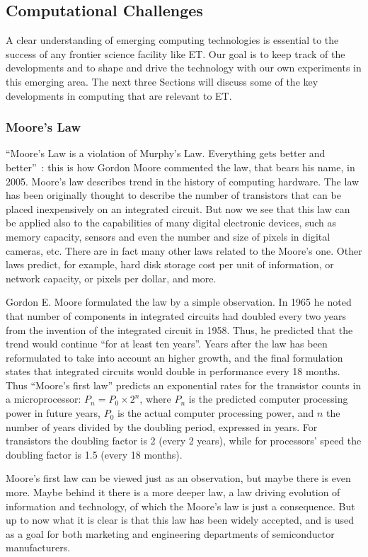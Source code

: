 \subsection{Computational Challenges}
A clear understanding of emerging computing technologies is essential to
the success of any frontier science facility like ET.
Our goal is to keep track of the developments and to shape and drive
the technology with our own experiments in this emerging area. The next
three Sections will discuss some of the key developments in computing that
are relevant to ET.


\subsubsection{Moore's Law}
\label{sec:MLbox}
``Moore's Law is a violation of Murphy's Law. Everything gets better and better''~\cite{MooresFrase2}: this is how Gordon Moore
commented the law, that bears his name, in 2005. Moore's law describes trend in the history of computing
hardware. The law has been originally thought to describe the number of transistors that can be placed
inexpensively on an integrated circuit. But now we see that this law can be applied also to the capabilities
of many digital electronic devices, such as memory capacity, sensors and even the number and size
of pixels in digital cameras, etc. There are in fact many other laws related to the Moore's one. Other laws
predict, for example, hard disk storage cost per unit of information, or network capacity, or pixels
per dollar, and more.

Gordon E. Moore formulated the law by a simple observation. In 1965 he noted that number of components
in integrated circuits had doubled every two years from the invention of the integrated circuit in 1958. Thus, he predicted that the trend would continue ``for at least ten years''. Years after the law has been
reformulated to take into account an higher growth, and the final formulation states that integrated circuits
would double in performance every 18 months. Thus ``Moore's first law'' predicts an exponential rates for the transistor counts in a microprocessor: $P_n = P_0 \times 2^n$, where $P_n$ is the predicted computer processing power in
future years, $P_0$ is the actual computer processing power, and $n$ the number of years divided by the doubling period, expressed in years. For transistors the doubling factor is 2 (every 2 years), while for processors' speed the doubling factor is 1.5 (every 18 months).

Moore's first law can be viewed just as an observation, but maybe there is even more. Maybe behind
it there is a more deeper law, a law driving evolution of information and technology, of which the
Moore's law is just a consequence. But up to now what it is clear is that this law has been
widely accepted, and is used as a goal for both marketing and engineering departments of 
semiconductor manufacturers.


